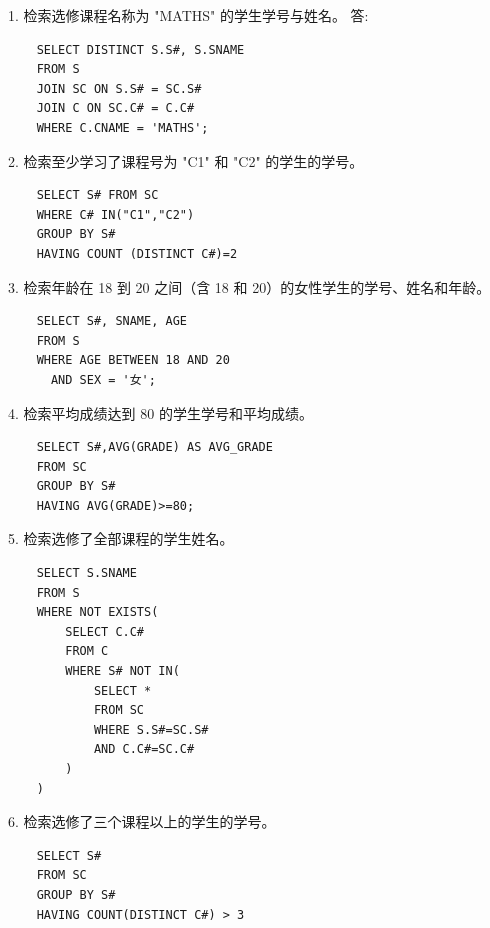 \documentclass[12pt,a4paper]{article}
\begin{document}
1. 检索选修课程名称为 "MATHS" 的学生学号与姓名。
答:\begin{lstlisting}
    SELECT DISTINCT S.S#, S.SNAME
    FROM S
    JOIN SC ON S.S# = SC.S#
    JOIN C ON SC.C# = C.C#
    WHERE C.CNAME = 'MATHS';
\end{lstlisting}
2. 检索至少学习了课程号为 "C1" 和 "C2" 的学生的学号。
\begin{lstlisting}
    SELECT S# FROM SC
    WHERE C# IN("C1","C2")
    GROUP BY S#
    HAVING COUNT (DISTINCT C#)=2
\end{lstlisting}
3. 检索年龄在 18 到 20 之间（含 18 和 20）的女性学生的学号、姓名和年龄。
\begin{lstlisting}
    SELECT S#, SNAME, AGE
    FROM S
    WHERE AGE BETWEEN 18 AND 20
      AND SEX = '女'; 
\end{lstlisting}
4. 检索平均成绩达到 80 的学生学号和平均成绩。
\begin{lstlisting}
    SELECT S#,AVG(GRADE) AS AVG_GRADE
    FROM SC
    GROUP BY S#
    HAVING AVG(GRADE)>=80;
\end{lstlisting}
5. 检索选修了全部课程的学生姓名。
\begin{lstlisting}
    SELECT S.SNAME
    FROM S 
    WHERE NOT EXISTS(
        SELECT C.C#
        FROM C 
        WHERE S# NOT IN(
            SELECT *
            FROM SC
            WHERE S.S#=SC.S#
            AND C.C#=SC.C#
        )
    )
\end{lstlisting}
6. 检索选修了三个课程以上的学生的学号。
\begin{lstlisting}
    SELECT S#
    FROM SC
    GROUP BY S#
    HAVING COUNT(DISTINCT C#) > 3 
\end{lstlisting}
\end{document}
